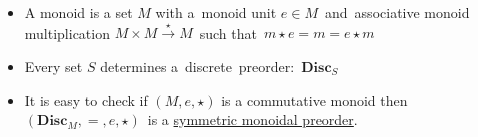 \begin{itemize}
    \item A monoid is a set $M$ with a \,monoid unit $e \in M$\, and \,associative monoid multiplication $M \times M \xrightarrow{\star} M$\, such that \,$m \star e=m=e \star m$\,
    \item Every set $S$ determines a \,discrete\, preorder: \,$\mathbf{Disc}_S$\,
    \item It is easy to check if $(M,e,\star)$ is a commutative monoid then \,$(\mathbf{Disc}_M, =, e, \star)$\, is a \href{doc/1 math/Seven Sketches in Compositionality/Chapter 2: Resource theories/2 Symmetric monoidal preorders/1 Definition and first examples/1 Symmetric monoidal structure on a preorder}{symmetric monoidal preorder}.
  \end{itemize}